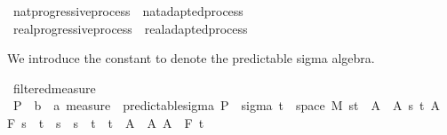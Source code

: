 \begin{isabellebody}
\ nat{\isacharunderscore}{\kern0pt}progressive{\isacharunderscore}{\kern0pt}process\ {\isasymsubseteq}\ nat{\isacharunderscore}{\kern0pt}adapted{\isacharunderscore}{\kern0pt}process%
\isadelimproof
\ %
\endisadelimproof
%
\isatagproof
\isacommand{{\isachardot}{\kern0pt}{\isachardot}{\kern0pt}}\isamarkupfalse%
%
\endisatagproof
{\isafoldproof}%
%
\isadelimproof
%
\endisadelimproof
\isanewline
{}\isamarkupfalse%
\ real{\isacharunderscore}{\kern0pt}progressive{\isacharunderscore}{\kern0pt}process\ {\isasymsubseteq}\ real{\isacharunderscore}{\kern0pt}adapted{\isacharunderscore}{\kern0pt}process%
\isadelimproof
\ %
\endisadelimproof
%
\isatagproof
\isacommand{{\isachardot}{\kern0pt}{\isachardot}{\kern0pt}}\isamarkupfalse%
%
\endisatagproof
{\isafoldproof}%
%
\isadelimproof
%
\endisadelimproof
%
\isadelimdocument
%
\endisadelimdocument
%
\isatagdocument
%
\isamarkuptrue%
%
\endisatagdocument
{\isafolddocument}%
%
\isadelimdocument
%
\endisadelimdocument
%
\begin{isamarkuptext}%
We introduce the constant  to denote the predictable sigma algebra.%
\end{isamarkuptext}\isamarkuptrue%
\isamarkupfalse%
\ filtered{\isacharunderscore}{\kern0pt}measure\isanewline
{}\isanewline
\isanewline
{}\isamarkupfalse%
\ {\isasymSigma}\isactrlsub P\ {\isacharcolon}{\kern0pt}{\isacharcolon}{\kern0pt}\ {\isachardoublequoteopen}{\isacharparenleft}{\kern0pt}{\isacharprime}{\kern0pt}b\ {\isasymtimes}\ {\isacharprime}{\kern0pt}a{\isacharparenright}{\kern0pt}\ measure{\isachardoublequoteclose}\ \ predictable{\isacharunderscore}{\kern0pt}sigma{\isacharcolon}{\kern0pt}\ {\isachardoublequoteopen}{\isasymSigma}\isactrlsub P\ {\isasymequiv}\ sigma\ {\isacharparenleft}{\kern0pt}{\isacharbraceleft}{\kern0pt}t\ {\isasymtimes}\ space\ M{\isacharparenright}{\kern0pt}\ {\isacharparenleft}{\kern0pt}{\isacharbraceleft}{\kern0pt}{\isacharbraceleft}{\kern0pt}s{\isacharless}{\kern0pt}{\isachardot}{\kern0pt}{\isachardot}{\kern0pt}t{\isacharbraceright}{\kern0pt}\ {\isasymtimes}\ A\ {\isacharbar}{\kern0pt}\ A\ s\ t{\isachardot}{\kern0pt}\ A\ {\isasymin}\ F\ s\ {\isasymand}\ t\ {\isasymle}\ s\ {\isasymand}\ s\ {\isacharless}{\kern0pt}\ t{\isacharbraceright}{\kern0pt}\ {\isasymunion}\ {\isacharbraceleft}{\kern0pt}{\isacharbraceleft}{\kern0pt}t\ {\isasymtimes}\ A\ {\isacharbar}{\kern0pt}\ A{\isachardot}{\kern0pt}\ A\ {\isasymin}\ F\ t\isanewline

\end{isabellebody}
